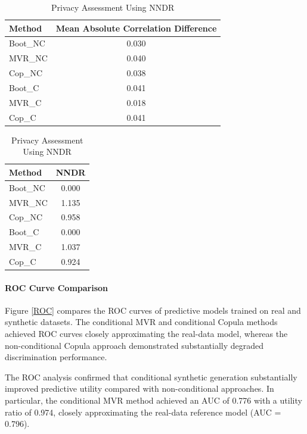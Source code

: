\documentclass[twoside]{article}
\begin{document}
\begin{table}[htb]
\centering

\begin{minipage}{0.48\textwidth}
\centering
\scriptsize
\caption{Correlation Preservation Results}
\begin{tabular}{lc}
\toprule
\textbf{Method} & \textbf{Mean Absolute Correlation Difference} \\
\midrule
Boot\_NC & 0.030 \\
MVR\_NC & 0.040 \\
Cop\_NC & 0.038 \\
Boot\_C & 0.041 \\
MVR\_C & 0.018 \\
Cop\_C & 0.041 \\

\bottomrule
\end{tabular}
\label{tab:correlation}
\end{minipage}
\hfill
\begin{minipage}{0.48\textwidth}
\centering
\scriptsize
\caption{Privacy Assessment Using NNDR}
\begin{tabular}{lc}
\toprule
\textbf{Method} & \textbf{NNDR} \\
\midrule
Boot\_NC & 0.000 \\
MVR\_NC & 1.135 \\
Cop\_NC & 0.958 \\
Boot\_C & 0.000 \\
MVR\_C & 1.037 \\
Cop\_C & 0.924 \\
\bottomrule
\end{tabular}
\label{tab:privacy}
\end{minipage}

\end{table}


\paragraph{ROC Curve Comparison}

\noindent Figure \ref{ROC} compares the ROC curves of predictive models trained on real and synthetic datasets. The conditional MVR and conditional Copula methods achieved ROC curves closely approximating the real-data model, whereas the non-conditional Copula approach demonstrated substantially degraded discrimination performance.

\noindent The ROC analysis confirmed that conditional synthetic generation substantially improved predictive utility compared with non-conditional approaches. In particular, the conditional MVR method achieved an AUC of 0.776 with a utility ratio of 0.974, closely approximating the real-data reference model (AUC = 0.796).
\end{document}

